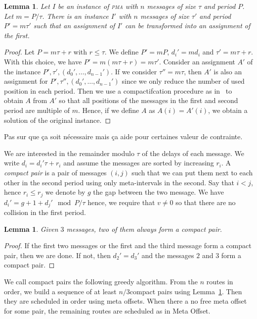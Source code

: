 \documentclass[10pt, conference, letterpaper]{IEEEtran}
\newtheorem{lemma}[theorem]{Lemma}
\newcommand\pma{\textsc{pma}\xspace}
\begin{document}
\begin{lemma}
Let $I$ be an instance of \pma with $n$ messages of size $\tau$ and period $P$.
Let $m = P / \tau$. There is an instance $I'$ with $n$ messages of size $\tau'$ and period $P'= m\tau'$ such that an assignment of $I'$ can be transformed into an assignment of the first.
\end{lemma}
\begin{proof}
Let $P = m \tau + r$ with $r \leq \tau$. We define $P' = mP$, $d_{i}' = m d_i$ 
and $\tau' = m \tau + r$. With this choice, we have $P' = m(m \tau + r) = m \tau'$.
Consider an assignment $A'$ of the instance $P',\tau',(d_{0}',\dots,d_{n-1}')$.
If we consider $\tau'' = m\tau$, then $A'$ is also an assignment for $P',\tau'',(d_{0}',\dots,d_{n-1}')$ since we only reduce the number of used position in each period. 
Then we use a compactifcation procedure as in~\cite{barth2018deterministic} to obtain $A$ from $A'$ so that all positions of the messages in the first and second period
are multiple of $m$. Hence, if we define $A$ as $A(i) = A'(i)$, we obtain a solution of the 
original instance.
\end{proof}
Pas sur que ça soit nécessaire mais ça aide pour certaines valeur de contrainte.

We are interested in the remainder modulo $\tau$ of the delays of each message.
We write $d_i = d_{i}'\tau + r_i$ and assume the messages are sorted by increasing $r_i$.
A \emph{compact pair} is a pair of messages $(i,j)$ such that we can put them
next to each other in the second period using only meta-intervals in the second.
Say that $i < j$, hence $r_i \leq r_j$ we denote by $g$ the gap between the two message.
We have $d_{i}' = g + 1 + d_{j}' \mod P/\tau$ hence, we require that $v \neq 0$ so that
there are no collision in the first period. 

\begin{lemma}\label{lemma:pair_find}
Given $3$ messages, two of them always form a compact pair. 
\end{lemma}
\begin{proof}

If the first two messages or the first and the third message form a compact pair,
then we are done. If not, then $d_{2}' = d_{3}'$ and the messages $2$ and $3$
form a compact pair.
\end{proof}

We call compact pairs the following greedy algorithm. From the $n$ routes in order,
we build a sequence of at least $n/3 $compact pairs using Lemma~\ref{lemma:pair_find}. Then they are scheduled in order using meta offsets. When there a no free meta offset for some pair, the remaining routes are scheduled as in Meta Offset.
\end{document}
